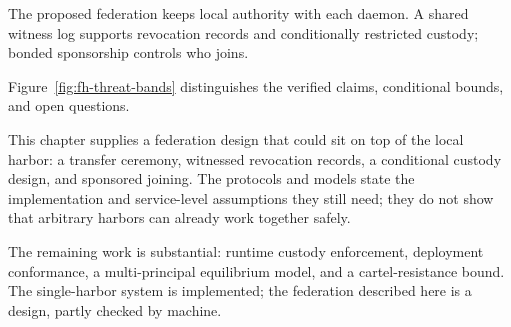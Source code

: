 \documentclass[11pt,a4paper]{article}
\theoremstyle{definition}
\theoremstyle{remark}
\begin{document}
The proposed federation keeps local authority with each daemon. A shared
witness log supports revocation records and conditionally restricted custody;
bonded sponsorship controls who joins.

Figure~\ref{fig:fh-threat-bands} distinguishes the verified claims, conditional bounds, and open questions.

This chapter supplies a federation design that could sit on top of the local harbor: a transfer ceremony, witnessed revocation records, a conditional custody design, and sponsored joining. The protocols and models state the implementation and service-level assumptions they still need; they do not show that arbitrary harbors can already work together safely.

The remaining work is substantial: runtime custody enforcement, deployment conformance, a multi-principal equilibrium model, and a cartel-resistance bound. The single-harbor system is implemented; the federation described here is a design, partly checked by machine.
\end{document}
